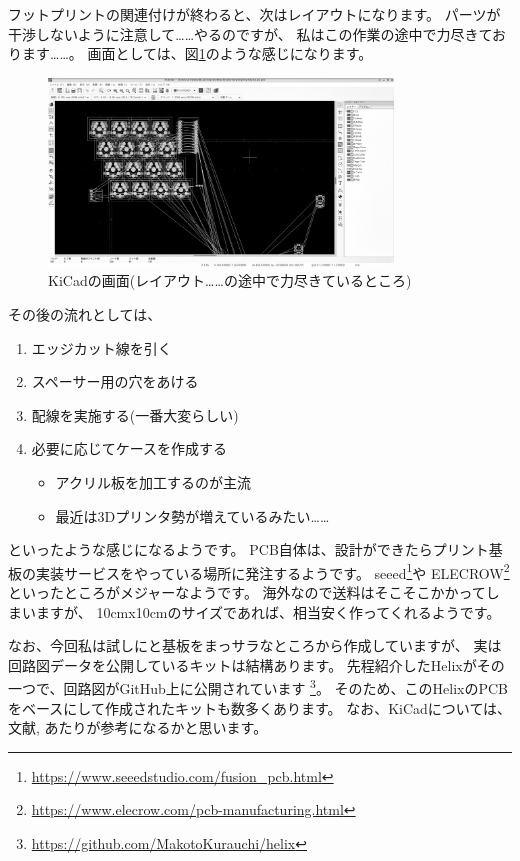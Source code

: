 \documentclass[mingoth,a4paper]{jsarticle}
\begin{document}
フットプリントの関連付けが終わると、次はレイアウトになります。
パーツが干渉しないように注意して……やるのですが、
私はこの作業の途中で力尽きております……。
画面としては、図\ref{fig:kicad-footprint}のような感じになります。

\begin{figure}[htbp]
 \begin{center}
  \includegraphics[keepaspectratio,height=5cm]{./image201911-kansai-02/kicad-layout.png}
 \end{center}
 \vspace*{-1zw}
 \caption{KiCadの画面(レイアウト……の途中で力尽きているところ)}
 \label{fig:kicad-footprint}
\end{figure}

その後の流れとしては、

\begin{enumerate}
 \item エッジカット線を引く
 \item スペーサー用の穴をあける
 \item 配線を実施する(一番大変らしい)
 \item 必要に応じてケースを作成する
       \begin{itemize}
	\item アクリル板を加工するのが主流
	\item 最近は3Dプリンタ勢が増えているみたい……
       \end{itemize}
\end{enumerate}

といったような感じになるようです。
PCB自体は、設計ができたらプリント基板の実装サービスをやっている場所に発注するようです。
seeed\footnote{\url{https://www.seeedstudio.com/fusion_pcb.html}}や
ELECROW\footnote{\url{https://www.elecrow.com/pcb-manufacturing.html}}
といったところがメジャーなようです。
海外なので送料はそこそこかかってしまいますが、
10cmx10cmのサイズであれば、相当安く作ってくれるようです。

なお、今回私は試しにと基板をまっサラなところから作成していますが、
実は回路図データを公開しているキットは結構あります。
先程紹介したHelixがその一つで、回路図がGitHub上に公開されています%
\footnote{\url{https://github.com/MakotoKurauchi/helix}}。
そのため、このHelixのPCBをベースにして作成されたキットも数多くあります。
なお、KiCadについては、文献\cite{foostan01}, \cite{kicad}あたりが参考になるかと思います。
\end{document}
